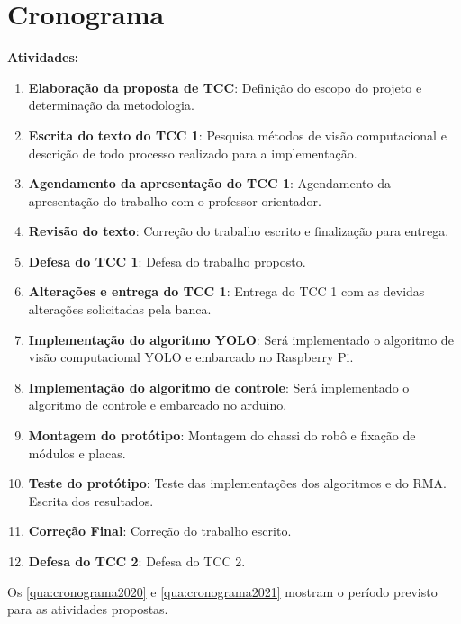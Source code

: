 
\chapter{Cronograma}
\label{chap:cronograma}

\noindent\hrulefill

\textbf{Atividades:}
\begin{enumerate}
	\item \textbf{Elaboração da proposta de TCC}: Definição do escopo do projeto e determinação da metodologia.
	\item \textbf{Escrita do texto do TCC 1}: Pesquisa métodos de visão computacional e descrição de todo  processo realizado para a implementação.
	\item \textbf{Agendamento da apresentação do TCC 1}: Agendamento da apresentação do trabalho com o professor orientador.
	\item \textbf{Revisão do texto}: Correção do trabalho escrito e finalização para entrega. 
	\item \textbf{Defesa do TCC 1}: Defesa do trabalho proposto.
	\item \textbf{Alterações e entrega do TCC 1}: Entrega do TCC 1 com as devidas alterações solicitadas pela banca. 	
	\item \textbf{Implementação do algoritmo YOLO}: Será implementado o algoritmo de visão computacional YOLO e embarcado no Raspberry Pi.
	\item \textbf{Implementação do algoritmo de controle}: Será implementado o algoritmo de controle e embarcado no arduino.
	\item \textbf{Montagem do protótipo}: Montagem do chassi do robô e fixação de módulos e placas.
	\item \textbf{Teste do protótipo}: Teste das implementações dos algoritmos e do RMA. Escrita dos resultados.
	\item \textbf{Correção Final}: Correção do trabalho escrito.
	\item \textbf{Defesa do TCC 2}: Defesa do TCC 2. 
\end{enumerate}

Os \autoref{qua:cronograma2020} e \autoref{qua:cronograma2021} mostram o período previsto para as atividades propostas.

